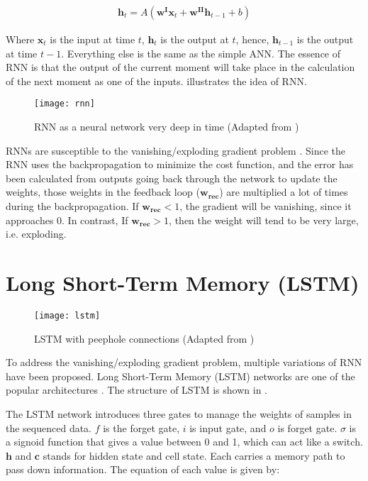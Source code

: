 \begin{gather}
    \mathbf{h}_t = A (\mathbf{w^Ix}_t + \mathbf{w^{II}h}_{t-1} + b)
\end{gather}

Where $\mathbf{x}_t$ is the input at time $t$, $\mathbf{h}_t$ is the output at $t$, hence, $\mathbf{h}_{t-1}$ is the output at time $t-1$. 
Everything else is the same as the simple ANN. The essence of RNN is that the output of the current moment will take place in the calculation 
of the next moment as one of the inputs.  illustrates the idea of RNN.

\begin{figure}[!htb]
    \centering
    \texttt{[image: rnn]}
    \caption{RNN as a neural network very deep in time (Adapted from \cite{rnnplot})}
    \label{Figure:RNN-structure}
\end{figure}

RNNs are susceptible to the vanishing/exploding gradient problem \cite{ribeiro2020exploding}. 
Since the RNN uses the backpropagation to minimize the cost function, and the error has been calculated from outputs going back through the network to update the weights, 
those weights in the feedback loop ($\mathbf{w_{rec}}$) are multiplied a lot of times during the backpropagation. 
If $\mathbf{w_{rec}} < 1$, the gradient will be vanishing, since it approaches 0. In contrast, If $\mathbf{w_{rec}} > 1$, then the weight will tend to be very large, i.e. exploding. 

\section{Long Short-Term Memory (LSTM)}

\begin{figure}[!htb]
    \centering
    \texttt{[image: lstm]}
    \caption{LSTM with peephole connections (Adapted from \cite{rnnplot})}
    \label{Figure:LSTM-structure}
\end{figure}

To address the vanishing/exploding gradient problem, multiple variations of RNN have been proposed. 
Long Short-Term Memory (LSTM) networks are one of the popular architectures \cite{lstm}. 
The structure of LSTM is shown in . 

The LSTM network introduces three gates to manage the weights of samples in the sequenced data. $f$ is the forget gate, $i$ is input gate, and $o$ is forget gate. 
$\sigma$ is a signoid function that gives a value between 0 and 1, which can act like a switch. 
$\mathbf{h}$ and $\mathbf{c}$ stands for hidden state and cell state. Each carries a memory path to pass down information.  
The equation of each value is given by: 

